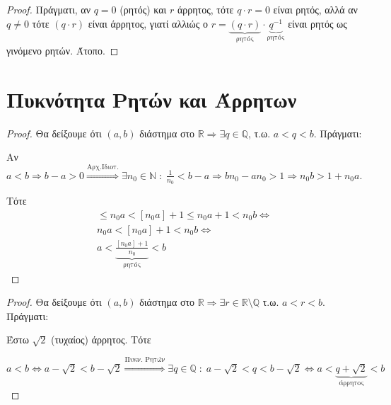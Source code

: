 \documentclass[main.tex]{subfiles}
\begin{document}
\begin{proof}
  Πράγματι, αν $ q=0 $ (ρητός) και $ r $ άρρητος, τότε $ q \cdot r =0 $ είναι ρητός, 
  αλλά αν $ q \neq 0 $ τότε $ (q \cdot r) $ είναι άρρητος, γιατί αλλιώς ο 
  $ r = \underbrace{(q \cdot r)}_{\text{ρητός}} \cdot \underbrace{q^{-1}}_{\text{
  ρητός}} $ είναι ρητός ως γινόμενο ρητών. Άτοπο.
\end{proof}


\section{Πυκνότητα Ρητών και Άρρητων}


\begin{proof}
\item {}
  Θα δείξουμε ότι $ (a,b) $ διάστημα στο $ \mathbb{R} \Rightarrow \exists q 
  \in \mathbb{Q} $, τ.ω. $ a < q < b $. Πράγματι:

  Αν $ a<b \Rightarrow b-a >0 \overset{\text{Αρχ.Ιδιοτ.}}{\Rightarrow} \exists 
  n_{0} \in \mathbb{N} \; : \; \frac{1}{n_{0}} < b-a \Rightarrow b n_{0} - a n_{0} 
  >1 \Rightarrow n_{0}b > 1+ n_{0}a$.

  Τότε 
  \begin{gather*}
    [n_{0}a] \leq n_{0}a < [n_{0}a]+1 \leq n_{0}a +1 < n_{0}b \Leftrightarrow \\
    n_{0}a < [n_{0}a]+1 < n_{0}b \Leftrightarrow \\
    a < \underbrace{\frac{[n_{0}a]+1}{n_{0}}}_{\text{ρητός}}< b
  \end{gather*}
\end{proof}


\begin{proof}
  Θα δείξουμε ότι $ (a,b) $ διάστημα στο $ \mathbb{R} \Rightarrow \exists r \in 
  \mathbb{R} \setminus \mathbb{Q} $ τ.ω. $a < r < b$. Πράγματι:

  Έστω $ \sqrt{2} $ (τυχαίος) άρρητος. Τότε

  $ a < b \Leftrightarrow a - \sqrt{2} < b- \sqrt{2} \overset{\text{Πυκν. Ρητών}}{\Rightarrow} \exists q \in \mathbb{Q} \; : \;  a - \sqrt{2} < q < b - 
  \sqrt{2} \Leftrightarrow  a < \underbrace{q + \sqrt{2}}_{\text{άρρητος}} < b $ 
\end{proof}
\end{document}
